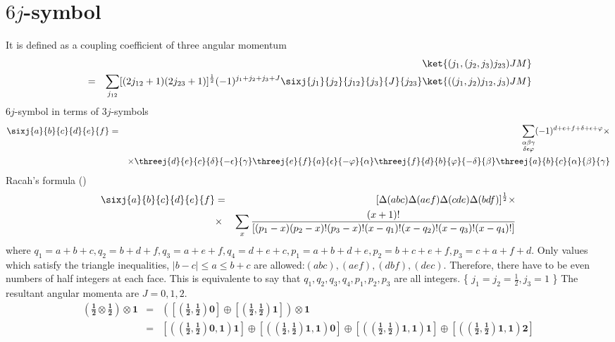 \documentclass{article}
\begin{document}
{\section{$6j$-symbol}
\label{sec-6}
It is defined as a coupling coefficient of three angular momentum
\begin{eqnarray}
&  &\ket{(j_1,(j_2,j_3)j_{23})JM}  \nonumber \\
 & = & \sum_{j_{12}} [(2j_{12}+1)(2j_{23}+1)]^{\frac{1}{2}}(-1)^{j_1+j_2+j_3+J}\sixj{j_1}{j_2}{j_{12}}{j_3}{J}{j_{23}} \ket{((j_1,j_2)j_{12},j_3)JM}
\end{eqnarray}
$6j$-symbol in terms of $3j$-symbols
\begin{eqnarray}
\label{}
\sixj{a}{b}{c}{d}{e}{f} &=& \sum_{\substack{\alpha \beta \gamma \\ \delta \epsilon \varphi}} (-1)^{d+e+f+\delta + \epsilon + \varphi} \times \nonumber\\
& &\times \threej{d}{e}{c}{\delta}{-\epsilon}{\gamma} \threej{e}{f}{a}{\epsilon}{-\varphi}{\alpha} \threej{f}{d}{b}{\varphi}{-\delta}{\beta} \threej{a}{b}{c}{\alpha}{\beta}{\gamma}
\end{eqnarray}
Racah's formula (\cite{Racah})
\begin{eqnarray}
\sixj{a}{b}{c}{d}{e}{f} & = & [\Delta(abc)\Delta(aef)\Delta(cde)\Delta(bdf)]^{\frac{1}{2}} \times \nonumber \\
 & \times & \sum_{x}\frac{(x+1)!}{ [(p_1 -x)(p_2 -x)!(p_3 -x)!(x-q_1)!(x-q_2)!(x-q_3)!(x-q_4)!]} \nonumber\\
\end{eqnarray}
where $q_1 = a+b+c, q_2 = b + d + f, q_3 = a+e+f, q_4 = d+e+c, p_1 = a+b+d+e, p_2 = b+c+e+f, p_3 = c+a+f+d$.
Only values which satisfy the triangle inequalities, $|b-c|\le a \le b+c$ are allowed:$(abc),(aef),(dbf),(dec)$. Therefore, there have to be even numbers of half integers at each face. This is equivalente to say that $q_1, q_2, q_3 , q_4, p_1, p_2, p_3$ are all integers.
\exa\{ $j_1=j_2=\frac{1}{2}, j_3=1$ \}
The resultant angular momenta are $J = 0, 1,2$.
\begin{eqnarray}
\left(\mathbf{\frac{1}{2}} \otimes \mathbf{\frac{1}{2}} \right) \otimes \mathbf{1}  
    & = & \mathbf{ \left(\left[\left(\frac{1}{2},\frac{1}{2}\right) 0 \right] \oplus \left[\left(\frac{1}{2},\frac{1}{2}\right) 1 \right]\right) \otimes 1}\nonumber\\
    & = & \mathbf{  \left[\left(\left(\frac{1}{2},\frac{1}{2}\right) 0, 1 \right) 1 \right] \oplus \left[\left(\left(\frac{1}{2},\frac{1}{2}\right) 1, 1 \right) 0 \right] \oplus \left[\left(\left(\frac{1}{2}, \frac{1}{2}\right) 1, 1 \right) 1 \right] \oplus \left[\left(\left(\frac{1}{2}, \frac{1}{2}\right) 1, 1 \right) 2 \right]} \nonumber

\end{eqnarray}}
\end{document}
